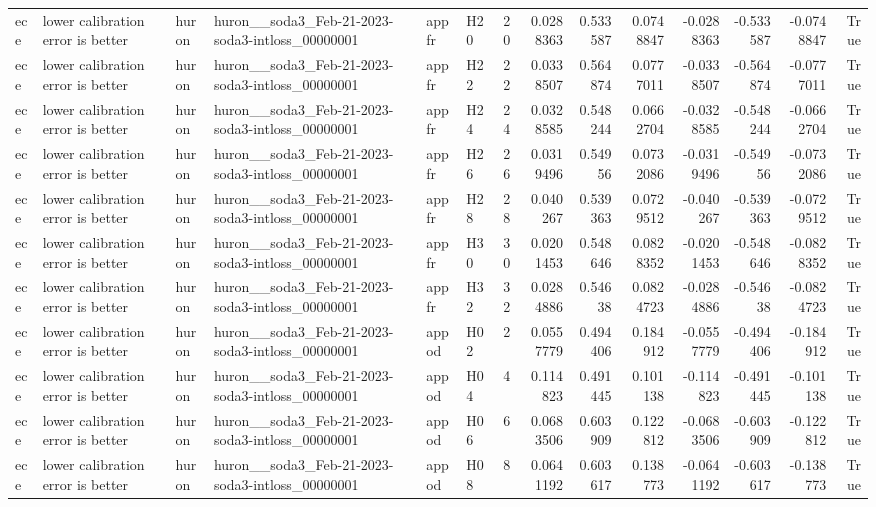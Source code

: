 \begin{longtable}{llllllrrrrrrrr}
ece & lower calibration error is better & huron & huron\_\_soda3\_Feb-21-2023-soda3-intloss\_00000001 & appfr & H20 & 20 & 0.0288363 & 0.533587 & 0.0748847 & -0.0288363 & -0.533587 & -0.0748847 & True \\
ece & lower calibration error is better & huron & huron\_\_soda3\_Feb-21-2023-soda3-intloss\_00000001 & appfr & H22 & 22 & 0.0338507 & 0.564874 & 0.0777011 & -0.0338507 & -0.564874 & -0.0777011 & True \\
ece & lower calibration error is better & huron & huron\_\_soda3\_Feb-21-2023-soda3-intloss\_00000001 & appfr & H24 & 24 & 0.0328585 & 0.548244 & 0.0662704 & -0.0328585 & -0.548244 & -0.0662704 & True \\
ece & lower calibration error is better & huron & huron\_\_soda3\_Feb-21-2023-soda3-intloss\_00000001 & appfr & H26 & 26 & 0.0319496 & 0.54956 & 0.0732086 & -0.0319496 & -0.54956 & -0.0732086 & True \\
ece & lower calibration error is better & huron & huron\_\_soda3\_Feb-21-2023-soda3-intloss\_00000001 & appfr & H28 & 28 & 0.040267 & 0.539363 & 0.0729512 & -0.040267 & -0.539363 & -0.0729512 & True \\
ece & lower calibration error is better & huron & huron\_\_soda3\_Feb-21-2023-soda3-intloss\_00000001 & appfr & H30 & 30 & 0.0201453 & 0.548646 & 0.0828352 & -0.0201453 & -0.548646 & -0.0828352 & True \\
ece & lower calibration error is better & huron & huron\_\_soda3\_Feb-21-2023-soda3-intloss\_00000001 & appfr & H32 & 32 & 0.0284886 & 0.54638 & 0.0824723 & -0.0284886 & -0.54638 & -0.0824723 & True \\
ece & lower calibration error is better & huron & huron\_\_soda3\_Feb-21-2023-soda3-intloss\_00000001 & appod & H02 & 2 & 0.0557779 & 0.494406 & 0.184912 & -0.0557779 & -0.494406 & -0.184912 & True \\
ece & lower calibration error is better & huron & huron\_\_soda3\_Feb-21-2023-soda3-intloss\_00000001 & appod & H04 & 4 & 0.114823 & 0.491445 & 0.101138 & -0.114823 & -0.491445 & -0.101138 & True \\
ece & lower calibration error is better & huron & huron\_\_soda3\_Feb-21-2023-soda3-intloss\_00000001 & appod & H06 & 6 & 0.0683506 & 0.603909 & 0.122812 & -0.0683506 & -0.603909 & -0.122812 & True \\
ece & lower calibration error is better & huron & huron\_\_soda3\_Feb-21-2023-soda3-intloss\_00000001 & appod & H08 & 8 & 0.0641192 & 0.603617 & 0.138773 & -0.0641192 & -0.603617 & -0.138773 & True \\

\end{longtable}
